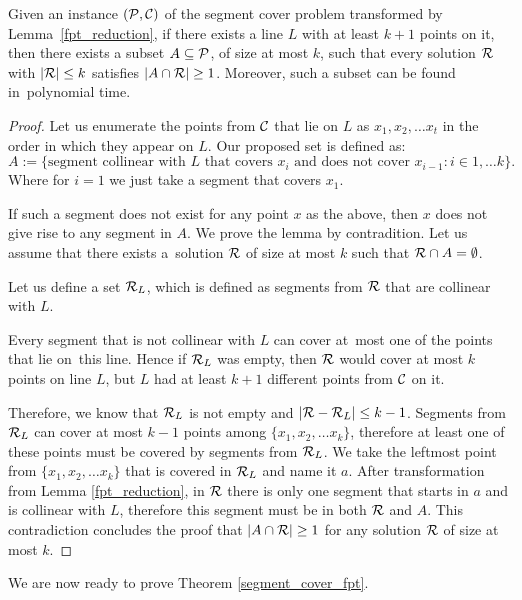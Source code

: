 \begin{lemma}
	\label{fpt_long_lines}
	Given an instance $(\mathcal{P}, \mathcal{C})$
	of the segment cover problem 
	transformed by Lemma~\ref{fpt_reduction},
	if there exists a line $L$ with at least
	$k+1$ points on it, then there exists a subset $A \subseteq \mathcal{P}$,
	of size at most $k$,
	such that every solution $\mathcal{R}$ with $|\mathcal{R}| \le k$
	satisfies $|A \cap \mathcal{R}| \ge 1$.
	Moreover, such a subset can be found in~polynomial time.
\end{lemma}
\begin{proof}
Let us enumerate the points from $\mathcal{C}$ that lie on $L$ as $x_1, x_2, \ldots x_t$
in the order in which they appear on $L$.
Our proposed set is defined as:
$$A := \{ \text{segment collinear with } L \text{ that covers } x_i
\text{ and does not cover } x_{i-1} : i \in 1, \ldots k\}.$$
Where for $i = 1$ we just take a segment that covers $x_1$.

If such a segment does not exist for any point $x$
as the above, then $x$ does not give rise to any segment in $A$.
We prove the lemma by contradition. Let us assume that there
exists a~solution $\mathcal{R}$ of size at most $k$ such that $\mathcal{R} \cap A = \emptyset$.


Let us define a set $\mathcal{R}_L$,
which is defined as segments from $\mathcal{R}$ that are collinear with $L$.

Every segment that is not collinear with $L$ can cover at~most one of
the points that lie on~this line.
Hence if $\mathcal{R}_L$ was empty, then
$\mathcal{R}$ would cover at most $k$ points on line $L$,
but $L$ had at least $k+1$ different points from $\mathcal{C}$ on it.

Therefore, we know that $\mathcal{R}_L$ is not empty
and $|\mathcal{R} - \mathcal{R}_L| \le k-1$.
Segments from $\mathcal{R}_L$ can cover at most $k-1$
points among $\{x_1, x_2, \ldots x_k\}$, therefore at least
one of these points must be covered by segments from $\mathcal{R}_L$.
We take the leftmost point from $\{x_1, x_2, \ldots x_k\}$ that is
covered in $\mathcal{R}_L$ and name it $a$.
After transformation from Lemma \ref{fpt_reduction},
in $\mathcal{R}$ there is only one segment
that starts in $a$ and is collinear with $L$,
therefore this segment must be in both $\mathcal{R}$ and $A$.
This contradiction concludes the proof that $|A \cap \mathcal{R}| \ge 1$
for any solution $\mathcal{R}$ of size at most $k$.
\end{proof}

We are now ready to prove Theorem \ref{segment_cover_fpt}.


